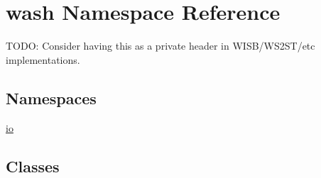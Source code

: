 \hypertarget{namespacewash}{}\section{wash Namespace Reference}
\label{namespacewash}


T\+O\+DO\+: Consider having this as a private header in W\+I\+S\+B/\+W\+S2\+S\+T/etc implementations.  


\subsection*{Namespaces}
\begin{DoxyCompactItemize}
\item 
 \mbox{\hyperlink{namespacewash_1_1io}{io}}
\end{DoxyCompactItemize}
\subsection*{Classes}
